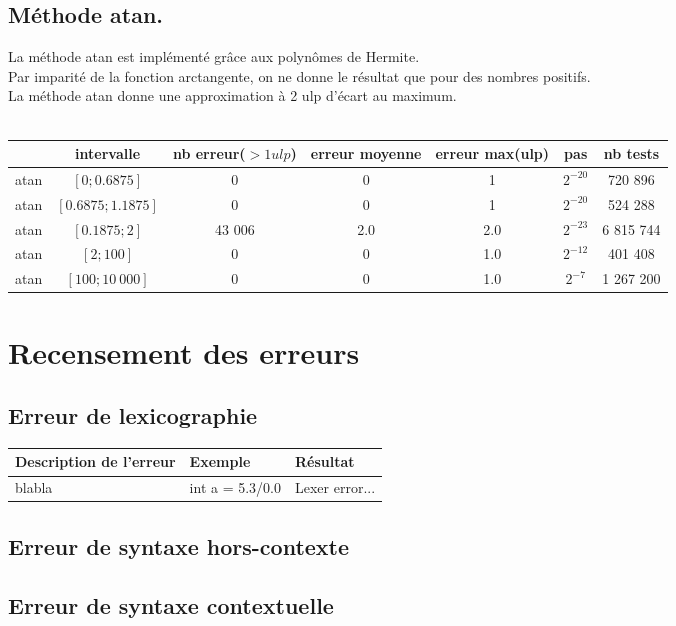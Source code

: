 \documentclass[a4,12pt]{article}
\begin{document}
\subsection{Méthode atan.}
La méthode atan est implémenté grâce aux polynômes de Hermite.\\
Par imparité de la fonction arctangente, on ne donne le résultat que pour des nombres positifs.\\
La méthode atan donne une approximation à 2 ulp d'écart au maximum.\\
\\

\hspace{-3cm}
\begin{tabular}{|c|c|c|c|c|c|c|}

\hline
 & intervalle & nb erreur($>1 ulp$) & erreur moyenne & erreur max(ulp) & pas & nb tests \\
\hline
atan & $[0; 0.6875]$ & 0 & 0 & 1 &$2^{-20}$ & 720 896\\
\hline
atan & $[0.6875; 1.1875]$ & 0 & 0 & 1 & $2^{-20}$ & 524 288\\
\hline
atan & $[0.1875; 2]$ & 43 006 & 2.0 & 2.0 & $2^{-23}$ & 6 815 744\\
\hline
atan & $[2; 100]$ & 0 & 0 & 1.0 & $2^{-12}$ & 401 408\\
\hline
atan & $[100; 10\ 000]$ & 0 & 0 & 1.0 & $2^{-7}$ & 1 267 200\\
\hline
\end{tabular}
\section{Recensement des erreurs}

\subsection{Erreur de lexicographie}
\begin{tabular}{|l|l|l|}
\hline
   Description de l'erreur & Exemple & Résultat \\
   \hline
   blabla & int a = 5.3/0.0 & Lexer error...  \\
   \hline
\end{tabular}
\subsection{Erreur de syntaxe hors-contexte}


\subsection{Erreur de syntaxe contextuelle}
\end{document}
